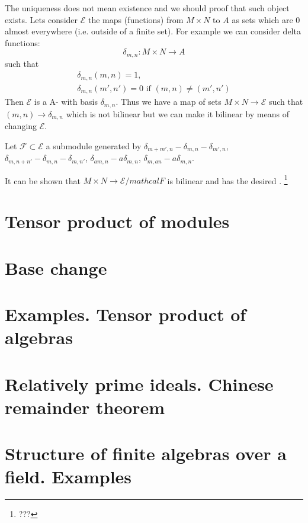 The uniqueness does not mean existence and we should proof that such
object exists. Lets consider $\mathcal{E}$ the maps (functions) from
$M \times N$ to $A$ as sets which are $0$ almost everywhere
(i.e. outside of a finite set). For example we can consider delta
functions:
\[
\delta_{m,n} : M \times N \to A
\]
such that
\begin{eqnarray}
  \delta_{m,n}(m,n) = 1,
  \nonumber \\
  \delta_{m,n}(m',n') = 0 \mbox{ if } (m,n) \ne (m',n')
  \nonumber 
\end{eqnarray}
Then $\mathcal{E}$ is a A- with basis
$\delta_{m,n}$. Thus we have a map of sets $M \times N \to
\mathcal{E}$ such that $(m,n) \to \delta_{m,n}$ which is not bilinear
but we can make it bilinear by means of changing $\mathcal{E}$.

Let $\mathcal{F} \subset \mathcal{E}$ a submodule generated by
$\delta_{m+m',n} - \delta_{m,n} - \delta_{m',n}$,
$\delta_{m,n+n'} - \delta_{m,n} - \delta_{m,n'}$,
$\delta_{am,n} - a\delta_{m,n}$,
$\delta_{m,an} - a\delta_{m,n}$.

It can be shown that $M \times N \to \mathcal{E}/mathcal{F}$ is
bilinear and has the desired .
\footnote{
  ???
}


\section{Tensor product of modules}

\section{Base change}

\section{Examples. Tensor product of algebras}

\section{Relatively prime ideals. Chinese remainder theorem}

\section{Structure of finite algebras over a field. Examples}
